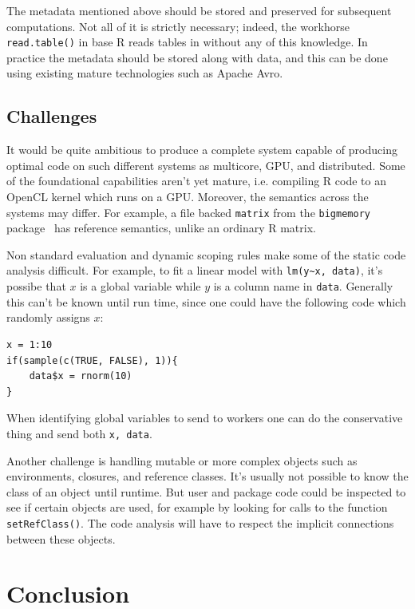 \documentclass[12pt]{article}
\begin{document}
The metadata mentioned above should be stored and preserved for subsequent
computations. Not all of it is strictly necessary; indeed, the workhorse
\texttt{read.table()} in base R reads tables in without any of this
knowledge. In practice the metadata should be stored along with data, and
this can be done using existing mature technologies such as Apache Avro.


\subsection{Challenges}

It would be quite ambitious to produce a complete system capable of
producing optimal code on such different systems as multicore, GPU, and
distributed. Some of the foundational capabilities aren't yet mature, i.e.
compiling R code to an OpenCL kernel which runs on a GPU. Moreover, the
semantics across the systems may differ. For example, a file backed
\texttt{matrix} from the \texttt{bigmemory} package~\cite{bigmemory} has reference
semantics, unlike an ordinary R matrix.

Non standard evaluation and dynamic scoping rules make some of the
static code analysis difficult. For example, to fit a linear model with
\texttt{lm(y\textasciitilde x, data)}, it's possibe that $x$ is a global variable while
$y$ is a column name in \texttt{data}. Generally this can't be known until
run time, since one could have the following code which randomly assigns
$x$:

\begin{verbatim}
x = 1:10
if(sample(c(TRUE, FALSE), 1)){
    data$x = rnorm(10)
}
\end{verbatim}

When identifying global variables to send to workers one can do the
conservative thing and send both \texttt{x, data}.

Another challenge is handling mutable or more complex objects
such as environments, closures, and reference classes.  It's usually not
possible to know the class of an object until runtime. But user and package
code could be inspected to see if certain objects are used, for example by
looking for calls to the function \texttt{setRefClass()}. The code
analysis will have to respect the implicit connections between these
objects.

\section{Conclusion}
\end{document}
